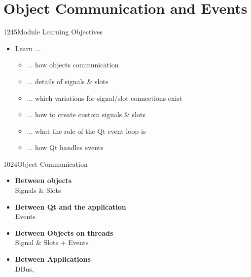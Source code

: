 %
%
%
%

\section{Object Communication and Events}

\begin{slide}{1245}{Module Learning Objectives}
\begin{itemize}
\item Learn ...
  \begin{itemize}
  \item ... how objects communication
  \item ... details of signals \& slots
  \item ... which variations for signal/slot connections exist
  \item ... how to create custom signals \& slots
  \item ... what the role of the Qt event loop is
  \item ... how Qt handles events
  \end{itemize}
\end{itemize}

\end{slide}


\begin{slide}{1024}{Object Communication}
\begin{itemize}
  \item \textbf{Between objects}\\
    Signals \& Slots\medskip
  \item \textbf{Between Qt and the application}\\
    Events\medskip
  \item \textbf{Between Objects on threads}\\
    Signal \& Slots + Events\medskip
  \item \textbf{Between Applications}\\
    DBus, 
\end{itemize}

\end{slide}





